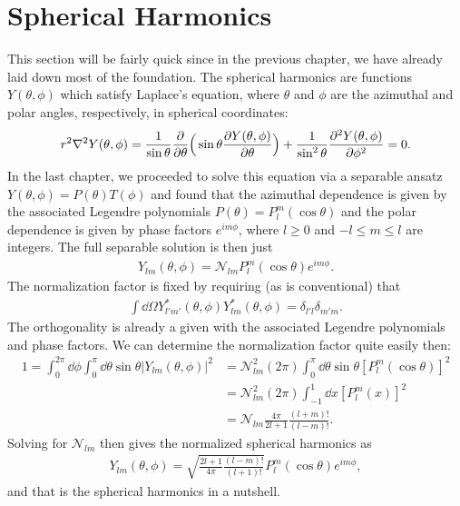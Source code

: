 \chapter{Spherical Harmonics}

This section will be fairly quick since in the previous chapter, we have already laid down most of the foundation.
The spherical harmonics are functions $Y(\theta,\phi)$ which satisfy Laplace's equation, where $\theta$ and $\phi$ are the azimuthal and polar angles, respectively, in spherical coordinates:
\begin{eqnarray}
    r^2 \laplacian Y(\theta,\phi) = \frac{1}{\sin{\theta}} \pdv{\theta} \Big( \sin{\theta} \pdv{Y(\theta,\phi)}{\theta} \Big) + \frac{1}{\sin^2{\theta}} \pdv[2]{Y(\theta,\phi)}{\phi} = 0
.\end{eqnarray}
In the last chapter, we proceeded to solve this equation via a separable ansatz $Y(\theta,\phi) = P(\theta) T(\phi)$ and found that the azimuthal dependence is given by the associated Legendre polynomials $P(\theta) = P_{l}^{m}(\cos{\theta})$ and the polar dependence is given by phase factors $e^{i m \phi}$, where $l \geq 0$ and $-l \leq m \leq l$ are integers.
The full separable solution is then just
\begin{eqnarray}
    Y_{lm}(\theta,\phi) = \mathcal{N}_{lm} P_{l}^{m}(\cos{\theta}) e^{im\phi}
.\end{eqnarray}
The normalization factor is fixed by requiring (as is conventional) that
\begin{eqnarray}
    \int \dd{\Omega} Y_{l'm'}^{*}(\theta,\phi) Y_{lm}^{*}(\theta,\phi) = \delta_{l'l} \delta_{m'm}
.\end{eqnarray}
The orthogonality is already a given with the associated Legendre polynomials and phase factors.
We can determine the normalization factor quite easily then:
\begin{align}
    1 = \int_{0}^{2\pi} \dd{\phi} \int_{0}^{\pi} \dd{\theta} \sin{\theta} |Y_{lm}(\theta,\phi)|^2 &= \mathcal{N}_{lm}^2 (2 \pi) \int_{0}^{\pi} \dd{\theta} \sin{\theta} [P_{l}^{m}(\cos{\theta})]^2 \nonumber \\
                                                                                              &= \mathcal{N}_{lm}^2 (2 \pi) \int_{-1}^{1} \dd{x} [ P_{l}^{m}(x) ]^2 \nonumber \\
                                                                                              &= \mathcal{N}_{lm} \frac{4 \pi}{2l+1} \frac{(l+m)!}{(l-m)!}
.\end{align}
Solving for $\mathcal{N}_{lm}$ then gives the normalized spherical harmonics as
\begin{eqnarray}
    Y_{lm}(\theta,\phi) = \sqrt{\frac{2l+1}{4 \pi} \frac{(l-m)!}{(l+1)!}} P_{l}^{m}(\cos{\theta}) e^{im\phi}
,\end{eqnarray}
and that is the spherical harmonics in a nutshell.


